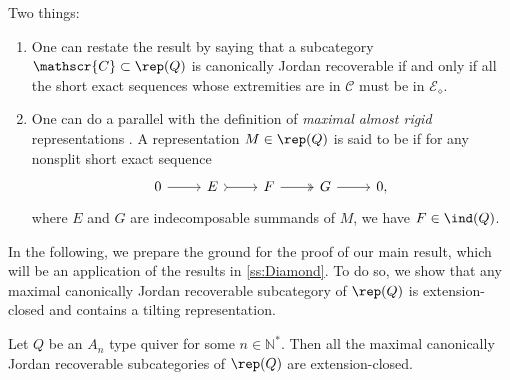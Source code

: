 \begin{remark}\label{rem:TwoThings} Two things:
\begin{enumerate}[label=$\bullet$,itemsep=1mm]
    \item One can restate the result by saying that a subcategory $\mathscr{C} \subset \rep(Q)$ is canonically Jordan recoverable if and only if all the short exact sequences whose extremities are in $\mathscr{C}$ must be in $\mathcal{E}_\diamond$.
    \item One can do a parallel with the definition of \emph{maximal almost rigid} representations \cite{BGMS23}. A representation $M \in \rep(Q)$ is said to be  if for any nonsplit short exact sequence \[\begin{tikzcd}
	0 & E & F  & G &  0,
	\arrow[from=1-1, to=1-2]
	\arrow[tail, from=1-2, to=1-3]
	\arrow[two heads,from=1-3, to=1-4]
	\arrow[from=1-4, to=1-5]
\end{tikzcd}\] where $E$ and $G$ are indecomposable summands of $M$, we have $F \in \ind(Q)$.
\end{enumerate}
\end{remark}

In the following, we prepare the ground for the proof of our main result, which will be an application of the results in \cref{ss:Diamond}. To do so, we show that any maximal canonically Jordan recoverable subcategory of $\rep(Q)$ is extension-closed and contains a tilting representation.

\begin{prop} \label{prop:maxCJRextclos}
    Let $Q$ be an $A_n$ type quiver for some $n \in \mathbb{N}^*$. Then all the maximal canonically Jordan recoverable subcategories of $\rep(Q)$ are extension-closed.
\end{prop}

